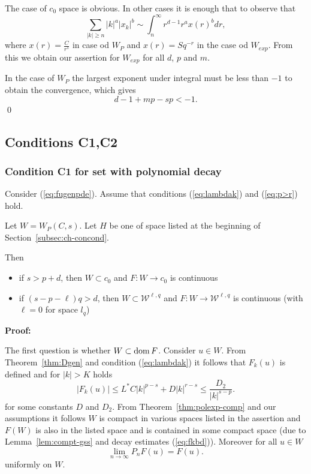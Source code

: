 The case of $c_0$ space is obvious. In other cases it is enough that to observe that
\begin{equation*}
  \sum_{|k| \geq n} |k|^a |x_k|^b \sim \int_{n}^\infty r^{d-1} r^a x(r)^{b}dr,
\end{equation*}
where $x(r)=\frac{C}{r^s}$ in case od $W_P$ and $x(r)=S q^{-r}$ in the case od $W_{exp}$. From this we obtain our assertion for $W_{exp}$ for all $d$, $p$ and $m$.

In the case of $W_P$ the largest exponent under integral must be less than $-1$ to obtain the convergence, which gives
\begin{equation*}
  d-1 + mp - sp < -1.
\end{equation*}
\qed



\subsection{Conditions \textbf{C1,C2}}






\subsubsection{Condition C1 for set with polynomial decay}

\begin{theorem}
\label{thm:existsCi} Consider (\ref{eq:fugenpde}). Assume that
conditions (\ref{eq:lambdak}) and
(\ref{eq:p>r}) hold.

Let $W=W_{P}(C,s)$. Let $H$ be one of space listed at the beginning of Section~\ref{subsec:ch-concond}.

Then
\begin{itemize}
  \item if $s > p+d$, then $W \subset c_0$ and $F:W \to c_0$ is continuous
  \item if $(s-p - \ell)q > d$, then   $W \subset \mathcal{W}^{\ell,q}$   and
  $F:W \to \mathcal{W}^{\ell,q}$ is continuous (with $\ell=0$ for space  $l_q$)
\end{itemize}


\end{theorem}
\textbf{Proof:}

The first question is whether  $W \subset {\rm dom}\,{F}$.
Consider $u \in W$. From Theorem~\ref{thm:Dgen} and condition (\ref{eq:lambdak}) it follows
that $F_k(u)$ is defined and for $|k|>K$ holds
\begin{equation}
  |F_k(u)| \leq L^* C |k|^{p-s} + D |k|^{r-s} \leq
  \frac{D_2}{|k|^{s-p}} \label{eq:fkbd}.
\end{equation}
for some constants $D$ and $D_2$.
From Theorem~\ref{thm:polexp-comp} and our assumptions it follows $W$ is compact in various spaces listed in the assertion and $F(W)$ is also in the listed space
and is contained in some compact space (due to Lemma~\ref{lem:compt-gss} and decay estimates (\ref{eq:fkbd})). Moreover for all  $u \in W$
\begin{equation*}
 \lim_{n \to \infty} P_n F(u)=F(u).
\end{equation*}
uniformly on $W$.

